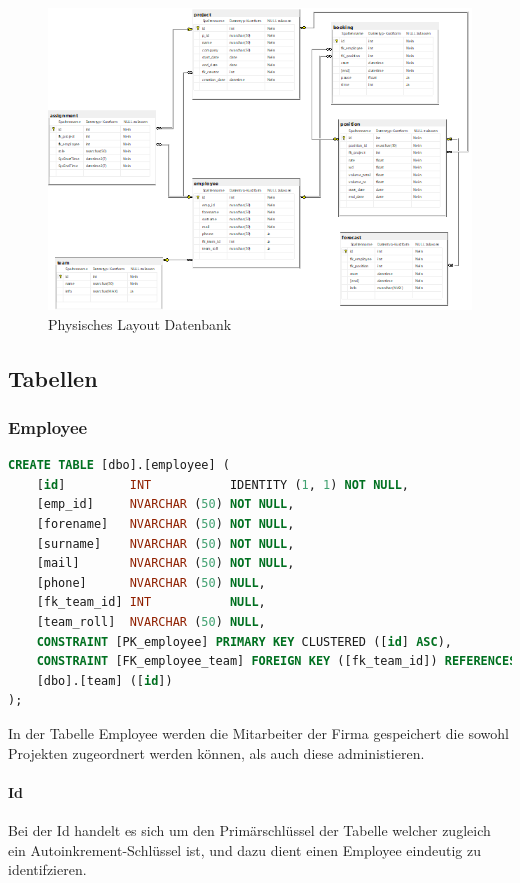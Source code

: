 \documentclass{article}
\begin{document}
\begin{figure}[h]
    \centering
    \includegraphics[width= \textwidth]{images/datenbankphysisches-Layout.png}
    \caption{Physisches Layout Datenbank}
    \label{fig:beispiel}
\end{figure}

\newpage

\subsection{Tabellen}

\subsubsection{Employee}
\begin{lstlisting}[language=Sql, caption= Create Table Statement für Employee Table]
    CREATE TABLE [dbo].[employee] (
    [id]         INT           IDENTITY (1, 1) NOT NULL,
    [emp_id]     NVARCHAR (50) NOT NULL,
    [forename]   NVARCHAR (50) NOT NULL,
    [surname]    NVARCHAR (50) NOT NULL,
    [mail]       NVARCHAR (50) NOT NULL,
    [phone]      NVARCHAR (50) NULL,
    [fk_team_id] INT           NULL,
    [team_roll]  NVARCHAR (50) NULL,
    CONSTRAINT [PK_employee] PRIMARY KEY CLUSTERED ([id] ASC),
    CONSTRAINT [FK_employee_team] FOREIGN KEY ([fk_team_id]) REFERENCES 
    [dbo].[team] ([id])
);
        \end{lstlisting}

In der Tabelle Employee werden die Mitarbeiter der Firma gespeichert die sowohl
Projekten zugeordnert werden können, als auch diese administieren.
\paragraph{Id}
Bei der Id handelt es sich um den Primärschlüssel der Tabelle welcher zugleich
ein Autoinkrement-Schlüssel ist, und dazu dient einen Employee eindeutig zu
identifzieren.
\end{document}
